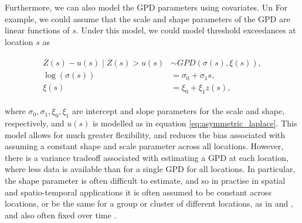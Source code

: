 \documentclass{article}
\numberwithin{equation}{section}
\begin{document}
Furthermore, we can also model the GPD parameters using covariates.
Un
For example, we could assume that the scale and shape parameters of the GPD are linear functions of $s$.
Under this model, we could model threshold exceedances at location $s$ as 
\begin{center}
  \begin{align} \label{eq:non_stationary_gpd}
    \begin{split}
      Z(s) - u(s) \mid Z(s) > u(s) &\sim GPD(\sigma(s), \xi(s)), \\
                   \log(\sigma(s)) &= \sigma_0 + \sigma_1 s, \\
                            \xi(s) &= \xi_0 + \xi_1 z(s),
    \end{split}
  \end{align}
\end{center}
where $\sigma_0, \sigma_1, \xi_0, \xi_1$ are intercept and slope parameters for the scale and shape, respectively, and $u(s)$ is modelled as in equation \ref{eq:asymmetric_laplace}.
This model allows for much greater flexibility, and reduces the bias associated with assuming a constant shape and scale parameter across all locations.
However, there is a variance tradeoff associated with estimating a GPD at each location, where less data is available than for a single GPD for all locations.
In particular, the shape parameter is often difficult to estimate, and so in practise in spatial and spatio-temporal applications it is often assumed to be constant across locations, or be the same for a group or cluster of different locations, as in \citet{Cooley2007} and \citet{Rohrbeck2021}, and also often fixed over time \citep{Risser2019, Zhang2024}. 
\end{document}

